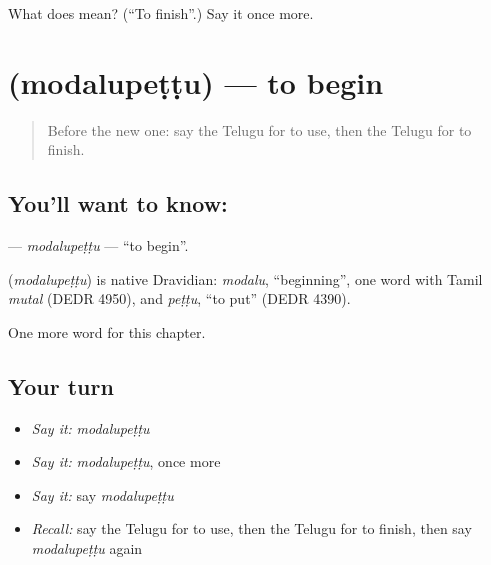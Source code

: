 \begin{tcolorbox}[breakable,colback=teal!4,colframe=teal!35!black,title={Before you move on}]
What does  mean? (\textquotedblleft{}To finish\textquotedblright{}.) Say it once more.
\end{tcolorbox}
\section[\texorpdfstring{\te{మొదలుపెట్టు} (modalupeṭṭu)}{మొదలుపెట్టు (modalupeṭṭu)}]{ (modalupeṭṭu) — to begin}

\label{lesson:TE-C242-modalupettu}



\begin{quote}
Before the new one: say the Telugu for to use, then the Telugu for to finish.
\end{quote}

\subsection*{You'll want to know: }
\textbf{} — \emph{modalupeṭṭu} — \textquotedblleft{}to begin\textquotedblright{}.

\begin{cousinweb}
\textbf{} (\emph{modalupeṭṭu}) is native Dravidian: \emph{modalu}, \textquotedblleft{}beginning\textquotedblright{}, one word with Tamil \emph{mutal} (DEDR 4950), and \emph{peṭṭu}, \textquotedblleft{}to put\textquotedblright{} (DEDR 4390).
\end{cousinweb}

\begin{grammarlens}[title={What you've built}]
One more word for this chapter.
\end{grammarlens}

\subsection*{Your turn}
\begin{itemize}
\raggedright
  \item \emph{Say it:} \emph{modalupeṭṭu}
  \item \emph{Say it:} \emph{modalupeṭṭu}, once more
  \item \emph{Say it:} say \emph{modalupeṭṭu}
  \item \emph{Recall:} say the Telugu for to use, then the Telugu for to finish, then say \emph{modalupeṭṭu} again
\end{itemize}

